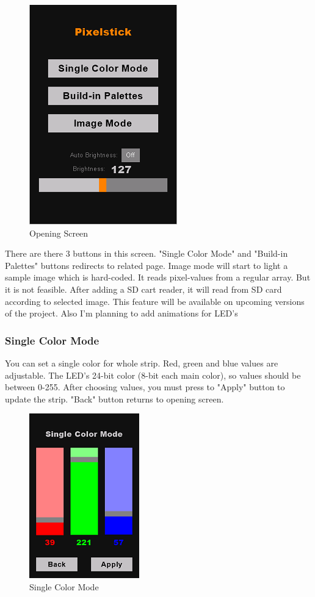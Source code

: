 \documentclass[conference]{IEEEtran}
\begin{document}
\begin{figure}[htbp]
\centerline{\includegraphics{opening.png}}
\caption{Opening Screen}
\label{fig}
\end{figure}

There are there 3 buttons in this screen. "Single Color Mode" and "Build-in Palettes" buttons redirects to related page. Image mode will start to light a sample image which is hard-coded. It reads pixel-values from a regular array. But it is not feasible. After adding a SD cart reader, it will read from SD card according to selected image. This feature will be available on upcoming versions of the project. Also I'm planning to add animations for LED's \\

\subsubsection{Single Color Mode}
You can set a single color for whole strip. Red, green and blue values are adjustable. The LED's 24-bit color (8-bit each main color), so values should be between 0-255. After choosing values, you must press to "Apply" button to update the strip. "Back" button returns to opening screen.

\begin{figure}[htbp]
\centerline{\includegraphics{single_color.png}}
\caption{Single Color Mode}
\label{fig}
\end{figure}
\end{document}
